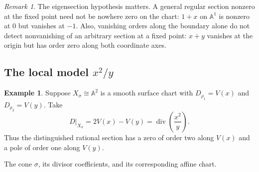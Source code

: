 \documentclass[11pt]{article}
\theoremstyle{definition}
\newtheorem{Ex}{Example}
\theoremstyle{remark}
\newtheorem{Rmk}{Remark}
\DeclareMathOperator{\divisor}{div}
\newcommand{\Sg}{\Sigma}
\newcommand{\bA}{\mathbb{A}}
\newcommand{\toricchart}{%
    \draw[gray!65,thick] (0.7,0) ellipse[x radius=2.45,y radius=1.35];
    \node at (2.6,1.2) {$X_\Sg$};
    \draw[teal!65!black,thick]
        (-1.55,0.18) .. controls (-1.12,0.72) and (-0.65,0.64) .. (-0.55,0.64)
        .. controls (0.12,0.46) and (1.02,0.52) .. (1.5,0.82)
        .. controls (1.66,0.91) and (1.8,1.02) .. (1.92,1.12);
    \draw[teal!65!black,thick]
        (-0.95,1.08) .. controls (-0.84,0.9) and (-0.72,0.77) .. (-0.55,0.64)
        .. controls (0.04,0.13) and (1.15,-0.01) .. (2.04,-0.49)
        .. controls (2.32,-0.65) and (2.54,-0.94) .. (2.55,-1.13);
    \draw[teal!65!black,thick]
        (1.19,1.11) .. controls (1.31,1.01) and (1.43,0.92) .. (1.5,0.82)
        .. controls (1.82,0.48) and (1.83,-0.07) .. (2.04,-0.49)
        .. controls (2.15,-0.71) and (2.23,-0.94) .. (2.26,-1.1);
    \foreach \point in {(-0.55,0.64),(1.5,0.82),(2.04,-0.49)}
        \fill \point circle (1.7pt);
    \draw[dashed,thick,gray] (-0.66,-0.02) ellipse[x radius=0.99,y radius=1.14];
    \node[below] at (-0.65,-1.18) {$X_\sigma$};
    \node[above left] at (-0.55,0.64) {$P_\sigma$};
    \node[below left,text=teal!65!black] at (-1.22,0.38) {$D_{\rho_1}$};
    \node[above left,text=teal!65!black] at (-0.95,1.08) {$D_{\rho_2}$};
}
\begin{document}
\begin{Rmk}
    The eigensection hypothesis matters. A general regular section
    nonzero at the fixed point need not be nowhere zero on the chart:
    \(1+x\) on \(\bA^1\) is nonzero at \(0\) but vanishes at \(-1\).
    Also, vanishing orders along the boundary alone do not detect
    nonvanishing of an arbitrary section at a fixed point: \(x+y\)
    vanishes at the origin but has order zero along both coordinate axes.
\end{Rmk}

\subsection{The local model \(x^2/y\)}

\begin{Ex}
    Suppose \(X_\sigma\cong\bA^2\) is a smooth surface chart with
    \(D_{\rho_1}=V(x)\) and \(D_{\rho_2}=V(y)\). Take
    \[
        D|_{X_\sigma}=2V(x)-V(y)=\divisor\!\left(\frac{x^2}{y}\right).
    \]
    Thus the distinguished rational section has a zero of order two
    along \(V(x)\) and a pole of order one along \(V(y)\).

    \Needspace{7cm}
    \begin{center}

    {\small The cone \(\sigma\), its divisor coefficients, and its
    corresponding affine chart.}
    \end{center}


\end{Ex}
\end{document}
